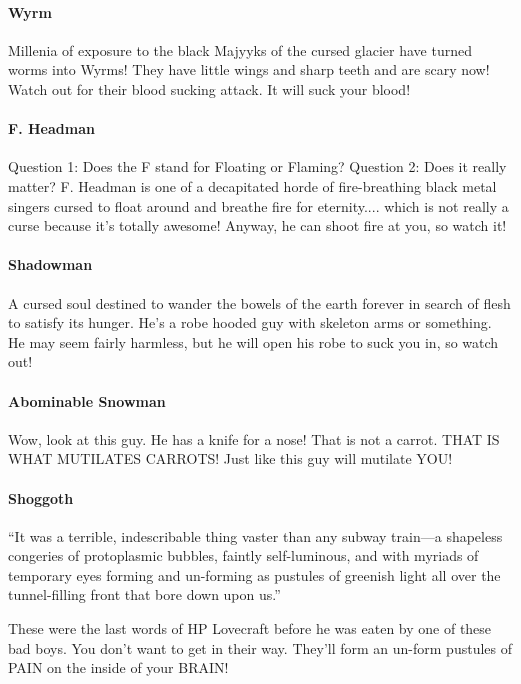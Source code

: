 \documentclass{article}
\begin{document}
\paragraph{Wyrm}
Millenia of exposure to the black Majyyks of the cursed glacier have turned worms into Wyrms!  They have little wings and sharp teeth and are scary now!  Watch out for their blood sucking attack.  It will suck your blood!

\paragraph{F. Headman}
Question 1: Does the F stand for Floating or Flaming?  Question 2: Does it really matter?  F. Headman is one of a decapitated horde of fire-breathing black metal singers cursed to float around and breathe fire for eternity.... which is not really a curse because it’s totally awesome!  Anyway, he can shoot fire at you, so watch it!

\paragraph{Shadowman}
A cursed soul destined to wander the bowels of the earth forever in search of flesh to satisfy its hunger.  He’s a robe hooded guy with skeleton arms or something.  He may seem fairly harmless, but he will open his robe to suck you in, so watch out!

\paragraph{Abominable Snowman}
Wow, look at this guy.  He has a knife for a nose!  That is not a carrot.  THAT IS WHAT MUTILATES CARROTS!  Just like this guy will mutilate YOU!

\paragraph{Shoggoth}
“It was a terrible, indescribable thing vaster than any subway train—a shapeless congeries of protoplasmic bubbles, faintly self-luminous, and with myriads of temporary eyes forming and un-forming as pustules of greenish light all over the tunnel-filling front that bore down upon us.”

These were the last words of HP Lovecraft before he was eaten by one of these bad boys.  You don’t want to get in their way.  They’ll form an un-form pustules of PAIN on the inside of your BRAIN!
\end{document}
